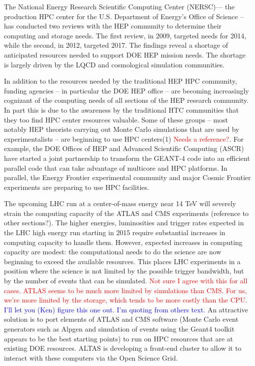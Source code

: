 The National Energy Research Scientific Computing Center (NERSC)--– the production HPC center for the U.S. Department of Energy’s Office of Science -- has conducted two reviews with the HEP community to determine their computing and storage needs. The first review, in 2009, targeted needs for 2014, while the second, in 2012, targeted 2017.  The findings reveal a shortage of anticipated resources needed to support DOE HEP mission needs. 
The shortage is largely driven by the LQCD and cosmological simulation communities. 


In addition to the resources needed by the traditional HEP HPC community, funding agencies 
-- in particular the DOE HEP office -- are becoming increasingly cognizant of the computing 
needs of all sections of the HEP research community. In part this is due to the awareness 
by the traditional HTC communities that they too find HPC center resources valuable. 
Some of these groups -- most notably HEP theorists carrying out Monte Carlo simulations that 
are used by experimentalists -- are beginning to use HPC centers(1) \textcolor{red}{Needs a reference?}. 
For example, the DOE Offices of HEP and Advanced Scientific Computing (ASCR) have started a joint partnership to transform the GEANT-4 code into an efficient parallel code that can take advantage of multicore and HPC platforms. In parallel, the Energy Frontier experimental community and major Cosmic Frontier experiments are preparing to use HPC facilities.
 
The upcoming LHC run at a center-of-mass energy near 14 TeV will severely strain the computing capacity of the ATLAS and CMS experiments (reference to other sections?). The higher energies, luminosities and trigger rates expected in the LHC high energy run starting in 2015 require substantial increases in computing capacity to handle them. However, expected increases in computing capacity are modest: the computational needs to do the science are now beginning to exceed the available resources. This places LHC experiments in a position where the science is not limited by the possible trigger bandwidth, but by the number of events that can be simulated.  \textcolor{red}{Not sure I agree with this for all cases.  ATLAS seems to be much more limited by simulations than CMS.  For us, we're more limited by the storage, which tends to be more costly than the CPU.} 
\textcolor{blue}{I'll let you (Ken) figure this one out. I'm quoting from others text.}
 An attractive solution is to port elements of ATLAS and CMS software (Monte Carlo event generators such as Alpgen and simulation of events using the Geant4 toolkit appears to be the best starting points) to run on HPC resources that are at existing DOE resources. ALTAS is developing a front-end cluster to allow it to interact with these computers via the Open Science Grid.
 
